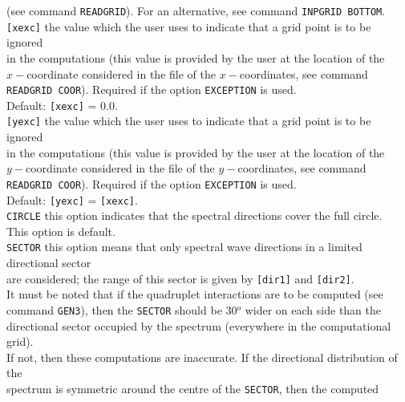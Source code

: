\documentclass[12pt]{book}
\begin{document}
\begin{tabbing}
                     (see command {\tt READGRID}). For an alternative, see command {\tt INPGRID BOTTOM}.\-\\
{\tt [xexc]}      \> the value which the user uses to indicate that a grid point is to be ignored\+\\
                     in the computations (this value is provided by the user at the location of the\\
                     $x-$coordinate considered in the file of the $x-$coordinates, see command\\
                     {\tt READGRID COOR}). Required if the option {\tt EXCEPTION} is used.\\
                     Default: {\tt [xexc]} = 0.0.\-\\
{\tt [yexc]}      \> the value which the user uses to indicate that a grid point is to be ignored\+\\
                     in the computations (this value is provided by the user at the location of the\\
                     $y-$coordinate considered in the file of the $y-$coordinates, see command\\
                     {\tt READGRID COOR}). Required if the option {\tt EXCEPTION} is used.\\
                     Default: {\tt [yexc]} = {\tt [xexc]}.\-\\
{\tt CIRCLE}      \> this option indicates that the spectral directions cover the full circle.\+\\
                     This option is default.\-\\
{\tt SECTOR}      \> this option means that only spectral wave directions in a limited directional sector\+\\
                     are considered; the range of this sector is given by {\tt [dir1]} and {\tt [dir2]}.\-\\
                  \> It must be noted that if the quadruplet interactions are to be computed (see\+\\
                     command {\tt GEN3}), then the {\tt SECTOR} should be 30$^o$ wider on each side than the\\
                     directional sector occupied by the spectrum (everywhere in the computational grid).\\
                     If not, then these computations are inaccurate. If the directional distribution of the\\
                     spectrum is symmetric around the centre of the {\tt SECTOR}, then the computed\\

\end{tabbing}
\end{document}
